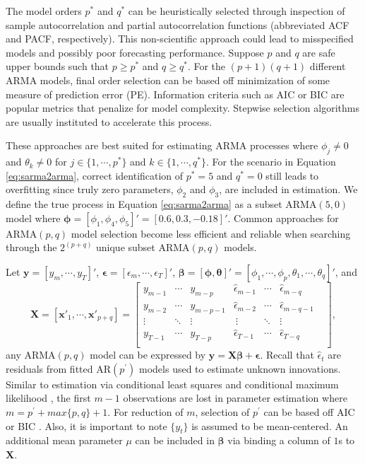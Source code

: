 The model orders $p^*$ and $q^*$ can be heuristically selected through inspection of sample autocorrelation and partial autocorrelation functions (abbreviated ACF and PACF, respectively). This non-scientific approach could lead to misspecified models and possibly poor forecasting performance. Suppose $p$ and $q$ are safe upper bounds such that $p\geq p^*$ and $q\geq q^*$. For the $(p+1)(q+1)$ different ARMA models, final order selection can be based off minimization of some measure of prediction error (PE). Information criteria such as AIC \citep{Akaike1974} or BIC \citep{Schwarz1978} are popular metrics that penalize for model complexity. Stepwise selection algorithms are usually instituted to accelerate this process.

These approaches are best suited for estimating ARMA processes where $\phi_j\neq 0$ and $\theta_k \neq 0$ for $j\in\{1,\cdots,p^*\}$ and $k\in\{1,\cdots,q^*\}$. For the scenario in Equation \ref{eq:sarma2arma}, correct identification of $p^*=5$ and $q^*=0$ still leads to overfitting since truly zero parameters, $\phi_2$ and $\phi_3$, are included in estimation. We define the true process in Equation \ref{eq:sarma2arma} as a subset ARMA$(5,0)$ model where $\bm{\phi}=[\phi_1,\phi_4,\phi_5]'=[0.6,0.3,-0.18]'$. Common approaches for ARMA$(p,q)$ model selection become less efficient and reliable when searching through the $2^{(p+q)}$ unique subset ARMA$(p,q)$ models.	

Let $\bm{y}=[y_{m},\cdots,y_T]'$, $\bm{\epsilon}=[\epsilon_{m},\cdots,\epsilon_T]'$, $\bm{\beta}=[\bm{\phi},\bm{\theta}]'=[\phi_1,\cdots,\phi_p,\theta_1,\cdots,\theta_q]'$, and 
\begin{equation*}
\bm{X}= [\bm{x}'_1,\cdots,\bm{x}'_{p+q}]=	\begin{bmatrix} y_{m-1} & \cdots & y_{m-p} &
					\hat{\epsilon}_{m-1} & \cdots & \hat{\epsilon}_{m-q} \\
					y_{m-2} & \cdots & y_{m-p-1} &
					\hat{\epsilon}_{m-2} & \cdots & \hat{\epsilon}_{m-q-1} \\
					\vdots & \ddots & \vdots &\
					\vdots & \ddots & \vdots & \\
					y_{T-1} & \cdots & y_{T-p} &
					\hat{\epsilon}_{T-1} & \cdots & \hat{\epsilon}_{T-q} \\
	\end{bmatrix},
\end{equation*}
any ARMA$(p,q)$ model can be expressed by $\bm{y}=\bm{X}\bm{\beta}+\bm{\epsilon}$. Recall that $\hat{\epsilon}_t$ are residuals from fitted AR$(p^\prime)$ models used to estimate unknown innovations. Similar to estimation via conditional least squares and conditional maximum likelihood \citep{Hamilton1994}, the first $m-1$ observations are lost in parameter estimation where $m=p^\prime+max\{p,q\}+1$. For reduction of $m$, selection of $p^\prime$ can be based off AIC or BIC  \citep{Hannan1984a,Chen2011}. Also, it is important to note $\{y_t\}$ is assumed to be mean-centered. An additional mean parameter $\mu$ can be included in $\bm{\beta}$ via  binding a column of $1$s to $\bm{X}$.

